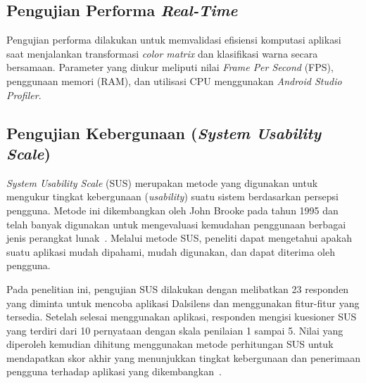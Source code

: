 \subsection{Pengujian Performa \textit{Real-Time}}
Pengujian performa dilakukan untuk memvalidasi efisiensi komputasi aplikasi saat menjalankan transformasi \textit{color matrix} dan klasifikasi warna secara bersamaan.
Parameter yang diukur meliputi nilai \textit{Frame Per Second} (FPS), penggunaan memori (RAM), dan utilisasi CPU menggunakan \textit{Android Studio Profiler}.

\subsection{Pengujian Kebergunaan (\textit{System Usability Scale})}
\textit{System Usability Scale} (SUS) merupakan metode yang digunakan untuk mengukur tingkat kebergunaan (\textit{usability}) suatu sistem berdasarkan persepsi pengguna.
Metode ini dikembangkan oleh John Brooke pada tahun 1995 dan telah banyak digunakan untuk mengevaluasi kemudahan penggunaan berbagai jenis perangkat lunak~\parencite{sus_original}.
Melalui metode SUS, peneliti dapat mengetahui apakah suatu aplikasi mudah dipahami, mudah digunakan, dan dapat diterima oleh pengguna.

Pada penelitian ini, pengujian SUS dilakukan dengan melibatkan 23 responden yang diminta untuk mencoba aplikasi Dalsilens dan menggunakan fitur-fitur yang tersedia.
Setelah selesai menggunakan aplikasi, responden mengisi kuesioner SUS yang terdiri dari 10 pernyataan dengan skala penilaian 1 sampai 5.
Nilai yang diperoleh kemudian dihitung menggunakan metode perhitungan SUS untuk mendapatkan skor akhir yang menunjukkan tingkat kebergunaan dan penerimaan pengguna terhadap aplikasi yang dikembangkan~\parencite{guntur2024simamurat}.

